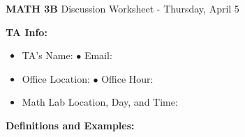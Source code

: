 \documentclass[12pt]{report}
\begin{document}
\begin{center}
\textbf{{\LARGE MATH 3B}  \hfill} Discussion Worksheet - Thursday, April 5\\

\end{center}

\noindent\textbf{TA Info:}

\begin{itemize}

\item TA's Name: \hspace{2.5in} $\bullet$ Email:

\medskip

\item Office Location: \hspace{2.22in} $\bullet$ Office Hour:

\medskip

\item Math Lab Location, Day, and Time:

\end{itemize} 

\noindent\textbf{Definitions and Examples:}
\end{document}

